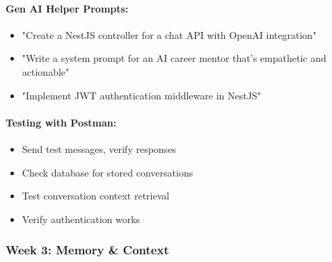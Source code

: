 \documentclass[12pt,a4paper]{article}
\begin{document}
\paragraph{Gen AI Helper Prompts:}
\begin{itemize}
    \item "Create a NestJS controller for a chat API with OpenAI integration"
    \item "Write a system prompt for an AI career mentor that's empathetic and actionable"
    \item "Implement JWT authentication middleware in NestJS"
\end{itemize}

\paragraph{Testing with Postman:}
\begin{itemize}
    \item Send test messages, verify responses
    \item Check database for stored conversations
    \item Test conversation context retrieval
    \item Verify authentication works
\end{itemize}

\subsubsection{Week 3: Memory \& Context}
\end{document}

